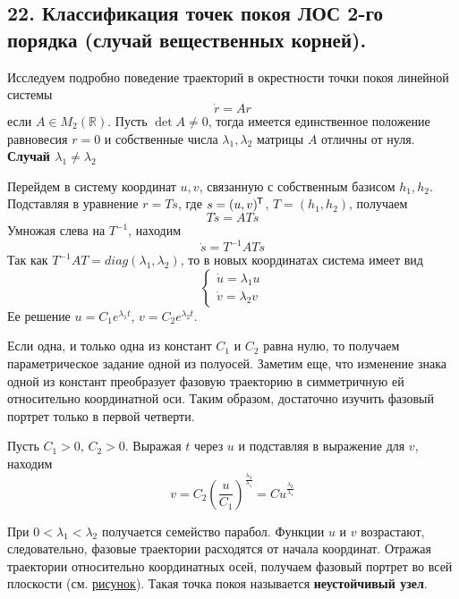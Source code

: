 \subsection*{22. Классификация точек покоя ЛОС 2-го порядка (случай вещественных корней).}

Исследуем подробно поведение траекторий в окрестности точки покоя линейной системы
\begin{equation*}
    \dot{r} = Ar
\end{equation*}
если $A \in M_2(\mathbb{R})$. Пусть $\det A \neq 0$, тогда имеется единственное положение равновесия $r = 0$ и собственные числа $\lambda_1, \lambda_2$ матрицы $A$ отличны от нуля.\\

\noindent \textbf{Случай $\lambda_1 \neq \lambda_2$}

Перейдем в систему координат $u, v$, связанную с собственным базисом $h_1, h_2$. Подставляя в уравнение $r = Ts$, где $s = (u, v)^{\mkern-1.5mu\mathsf{T}} $, $T = (h_1, h_2)$, получаем
\begin{equation*}
    T\dot{s} = ATs
\end{equation*}
Умножая слева на $T^{-1}$, находим
\begin{equation*}
    \dot{s} = T^{-1}ATs
\end{equation*}
Так как $T^{-1}AT = diag(\lambda_1, \lambda_2)$, то в новых координатах система имеет вид
\begin{equation*}
    \begin{cases}
        \dot{u} = \lambda_1 u \\
        \dot{v} = \lambda_2 v
    \end{cases}
\end{equation*}
Ее решение $u = C_1e^{\lambda_1 t}$, $v = C_2e^{\lambda_2 t}$.

Если одна, и только одна из констант $C_1$ и $C_2$ равна нулю, то получаем параметрическое задание одной из полуосей. Заметим еще, что изменение знака одной из констант преобразует фазовую траекторию в симметричную ей относительно координатной оси. Таким образом, достаточно изучить фазовый портрет только в первой четверти.

Пусть $C_1 > 0$, $C_2 > 0$. Выражая $t$ через $u$ и подставляя в выражение для $v$, находим
\begin{equation*}
    v = C_2\left(\frac{u}{C_1} \right)^{\frac{\lambda_2}{\lambda_1}} = Cu^{\frac{\lambda_2}{\lambda_1}}
\end{equation*}

При $0 < \lambda_1 < \lambda_2$ получается семейство парабол. Функции $u$ и $v$ возрастают, следовательно, фазовые траектории расходятся от начала координат. Отражая траектории относительно координатных осей, получаем фазовый портрет во всей плоскости (см. \hyperref[neustuzel]{рисунок}). Такая точка покоя называется \textbf{неустойчивый узел}.

